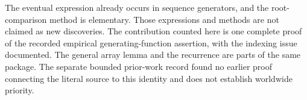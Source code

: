 The eventual expression already occurs in sequence generators, and
the root-comparison method is elementary. Those expressions and
methods are not claimed as new discoveries. The contribution counted
here is one complete proof of the recorded empirical generating-function
assertion, with the indexing issue documented. The general array lemma
and the recurrence are parts of the same package. The separate bounded
prior-work record found no earlier proof connecting the literal source
to this identity and does not establish worldwide priority.
